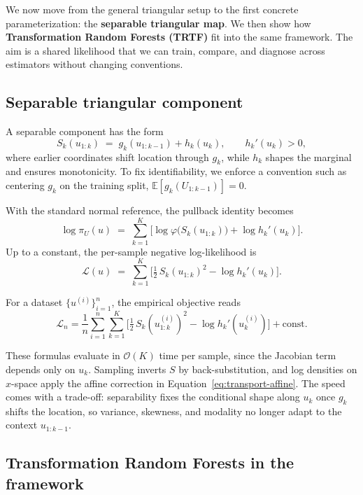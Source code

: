 \documentclass[11pt,a4paper,twoside]{book}\usepackage[]{graphicx}\usepackage[]{xcolor}
\begin{document}
We now move from the general triangular setup to the first concrete parameterization: the \textbf{separable triangular map}. We then show how \textbf{Transformation Random Forests (TRTF)} fit into the same framework. The aim is a shared likelihood that we can train, compare, and diagnose across estimators without changing conventions.

\subsection{Separable triangular component}

A separable component has the form
\begin{equation}
  S_k(u_{1:k}) \;=\; g_k(u_{1:k-1}) + h_k(u_k), \qquad h_k'(u_k) > 0,
  \label{eq:transport-separable}
\end{equation}
where earlier coordinates shift location through $g_k$, while $h_k$ shapes the marginal and ensures monotonicity. To fix identifiability, we enforce a convention such as centering $g_k$ on the training split, $\mathbb E[g_k(U_{1:k-1})]=0$.

With the standard normal reference, the pullback identity becomes
\begin{equation}
  \log \pi_U(u) \;=\; \sum_{k=1}^{K}\Big[\log \varphi\!\big(S_k(u_{1:k})\big) + \log h_k'(u_k)\Big].
  \label{eq:transport-likelihood}
\end{equation}
Up to a constant, the per-sample negative log-likelihood is
\begin{equation}
  \mathcal{L}(u) \;=\; \sum_{k=1}^{K}\Big[\tfrac{1}{2}\,S_k(u_{1:k})^2 - \log h_k'(u_k)\Big].
  \label{eq:transport-loss}
\end{equation}

For a dataset $\{u^{(i)}\}_{i=1}^n$, the empirical objective reads
\[
\mathcal L_n = \frac{1}{n}\sum_{i=1}^n \sum_{k=1}^{K}
\Big[\tfrac{1}{2}\,S_k(u^{(i)}_{1:k})^2 - \log h_k'(u^{(i)}_k)\Big] + \text{const}.
\]

These formulas evaluate in $\mathcal{O}(K)$ time per sample, since the Jacobian term depends only on $u_k$. Sampling inverts $S$ by back-substitution, and log densities on $x$-space apply the affine correction in Equation~\eqref{eq:transport-affine}. The speed comes with a trade-off: separability fixes the conditional shape along $u_k$ once $g_k$ shifts the location, so variance, skewness, and modality no longer adapt to the context $u_{1:k-1}$.

\subsection{Transformation Random Forests in the framework}\label{sec:transport-trtf}
\end{document}
